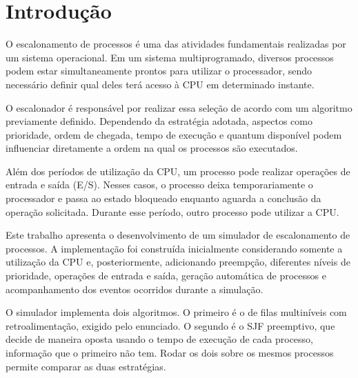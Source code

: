 \documentclass[12pt,a4paper]{article}
\begin{document}

\tableofcontents

\newpage



\section{Introdução}

O escalonamento de processos é uma das atividades fundamentais
realizadas por um sistema operacional. Em um sistema multiprogramado,
diversos processos podem estar simultaneamente prontos para utilizar
o processador, sendo necessário definir qual deles terá acesso à CPU
em determinado instante.

O escalonador é responsável por realizar essa seleção de acordo com
um algoritmo previamente definido. Dependendo da estratégia adotada,
aspectos como prioridade, ordem de chegada, tempo de execução e
quantum disponível podem influenciar diretamente a ordem na qual os
processos são executados.

Além dos períodos de utilização da CPU, um processo pode realizar
operações de entrada e saída (E/S). Nesses casos, o processo deixa
temporariamente o processador e passa ao estado bloqueado enquanto
aguarda a conclusão da operação solicitada. Durante esse período,
outro processo pode utilizar a CPU.

Este trabalho apresenta o desenvolvimento de um simulador de
escalonamento de processos. A implementação foi construída inicialmente considerando somente a utilização da CPU e, posteriormente, adicionando preempção, diferentes níveis de prioridade, operações de entrada e saída, geração automática de processos e acompanhamento dos eventos ocorridos durante a simulação.

O simulador implementa dois algoritmos. O primeiro é o de filas
multiníveis com retroalimentação, exigido pelo enunciado. O segundo é o
SJF preemptivo, que decide de maneira oposta usando o tempo de execução
de cada processo, informação que o primeiro não tem. Rodar os dois sobre os mesmos processos permite comparar as duas
estratégias.


\end{document}

